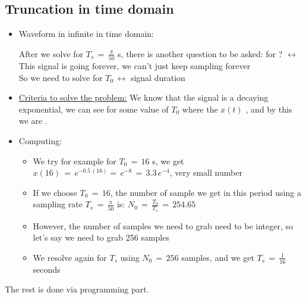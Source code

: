 \subsection{Truncation in time domain}

\begin{itemize}
    
\item Waveform in infinite in time domain:

After we solve for $T_s \, = \, \displaystyle\frac{\pi}{50}$ s, there is another question to be asked: for  ? $\leftrightarrow$ This signal is going forever, we can't just keep sampling forever\\


So we need to solve for  $T_0 \, \leftrightarrow$  signal duration

\item \underline{Criteria to solve the problem:} We know that the signal is a decaying exponential, we can see for some value of $T_0$ where the   $x(t)$  , and by this we are .\\

\item Computing: 
	
	\begin{itemize}
	\item We try for example for $T_0 \, = \, 16$ s, we get $x(16) \, = \, e^{-0.5 \, (16)} = \, e^{-8} \, = \, 3.3 \, e^{-4}$, very small number
	
	\item If we choose $T_0 \, = \, 16$, the number of sample we get in this period using a sampling rate $T_s \, = \, \displaystyle\frac{\pi}{50}$ is: $N_0 \, = \, \displaystyle\frac{T_0}{T_s} \, = \, 254.65$
	
	
	\item However, the number of samples we need to grab need to be integer, so let's say we need to grab 256 samples
	
	\item We resolve again for $T_s$ using $N_0 \, = \, 256$ samples, and we get $T_s \, = \, \displaystyle\frac{1}{16}$ seconds 
\end{itemize}

\end{itemize}

The rest is done via programming part.\\

